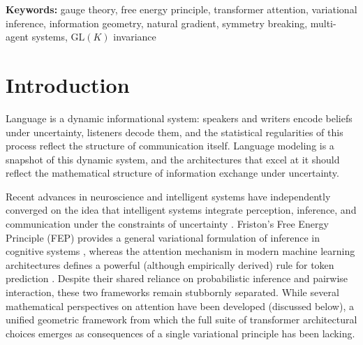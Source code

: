 \documentclass[twoside,11pt]{article}
\begin{document}
\begin{abstract}
We validate the unreduced theory by training a $\mathrm{GL}(K)$ gauge transformer on WikiText-103 using only KL divergences, gauge transport, and natural gradient dynamics---without learned attention projections, MLPs, or pointwise activation functions. The model achieves test perplexity 71.6, outperforming a standard transformer at matched embedding dimension by $1.66\times$ (PPL~118.6 at $d_{\text{model}} = 90$) while approaching a parameter-matched standard transformer (PPL~48.5 at $d_{\text{model}} = 1{,}280$). The learned gauge frames develop categorical separation in a low-dimensional subspace with within-category diversification in the bulk. A separate consistency check on frozen BERT across 105 passages confirms quantitative agreement between KL-based and dot-product attention in the degenerate limit (grand mean $r = 0.804$, 95\% CI $[0.771, 0.838]$). Both architectures operate in the flat bundle limit with trivially vanishing holonomy, a geometric regime we hypothesize is matched to the approximately path-independent semantic transport that compositional language requires.
\end{abstract}

\noindent\textbf{Keywords:} gauge theory, free energy principle, transformer attention, variational inference, information geometry, natural gradient, symmetry breaking, multi-agent systems, $\mathrm{GL}(K)$ invariance

\section{Introduction}

Language is a dynamic informational system: speakers and writers encode beliefs under uncertainty, listeners decode them, and the statistical regularities of this process reflect the structure of communication itself. Language modeling is a snapshot of this dynamic system, and the architectures that excel at it should reflect the mathematical structure of information exchange under uncertainty.

Recent advances in neuroscience and intelligent systems have independently converged on the idea that intelligent systems integrate perception, inference, and communication under the constraints of uncertainty \citep{bahdanau2014neural,amari1998natural,bronstein2021geometric}. Friston's Free Energy Principle (FEP) provides a general variational formulation of inference in cognitive systems \citep{friston2010free,parr2022active,friston2017graphical,ramstead2020variational}, whereas the attention mechanism in modern machine learning architectures defines a powerful (although empirically derived) rule for token prediction \citep{clark2019does,vaswani2017attention}. Despite their shared reliance on probabilistic inference and pairwise interaction, these two frameworks remain stubbornly separated. While several mathematical perspectives on attention have been developed (discussed below), a unified geometric framework from which the full suite of transformer architectural choices emerges as consequences of a single variational principle has been lacking.
\end{document}

